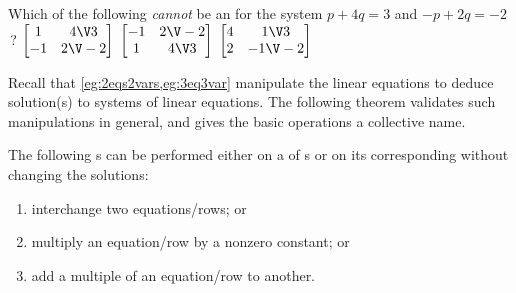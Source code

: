 \begin{activity}
Which of the following \emph{cannot} be an  for the system \(p+4q=3\) and \(-p+2q=-2\)\,?
{\(\begin{bmatrix} 1&4\V3\\-1&2\V-2 \end{bmatrix}\)}
{\(\begin{bmatrix} -1&2\V-2\\1&4\V3 \end{bmatrix}\)}
{\(\begin{bmatrix} 4&1\V3\\2&-1\V-2 \end{bmatrix}\)}
\end{activity}





Recall that \cref{eg:2eqs2vars,eg:3eq3var} manipulate the linear equations to deduce solution(s) to systems of linear equations.
The following theorem validates such manipulations in general, and gives the basic operations a collective name. 


\begin{theorem} \label{thm:erowop} 
The following s can be performed either on a  of s or on its corresponding  without changing the solutions:
\begin{enumerate}
\item {}interchange two equations\slash rows; or
\item multiply an equation\slash row by a nonzero constant; or
\item add a multiple of an equation\slash row to another.
\end{enumerate}
\end{theorem}

\begin{comment}
Interestingly, some other texts omit a proof that row operations preserve the solution(s).  Poole comments on reversibility.  Larson comments that row operations produce `equivalent' systems, but does not prove.  Beezer proves it.
\end{comment}

